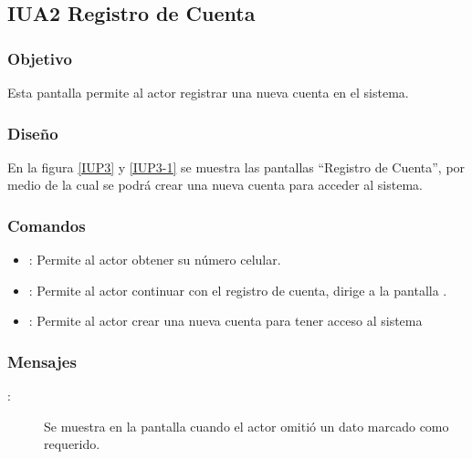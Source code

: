 \subsection{IUA2 Registro de Cuenta}
 
\subsubsection{Objetivo}

    Esta pantalla permite al actor registrar una nueva cuenta en el sistema.

\subsubsection{Diseño}

    En la figura \ref{IUP3} y \ref{IUP3-1}  se muestra las pantallas ``Registro de Cuenta'', por medio de la cual se podrá crear una nueva cuenta para  acceder al sistema. \\
\newpage
    \newpage

\subsubsection{Comandos}
\begin{itemize}
    \item {}: Permite al actor obtener su número celular.
    \item {}: Permite al actor continuar con el registro de cuenta, dirige a la pantalla .
    \item {}: Permite al actor crear una nueva cuenta para tener acceso al sistema
    
\end{itemize}

\subsubsection{Mensajes}

\begin{description}
    \item[:] Se muestra en la pantalla  cuando el actor omitió un dato marcado como requerido.
    
\end{description}
